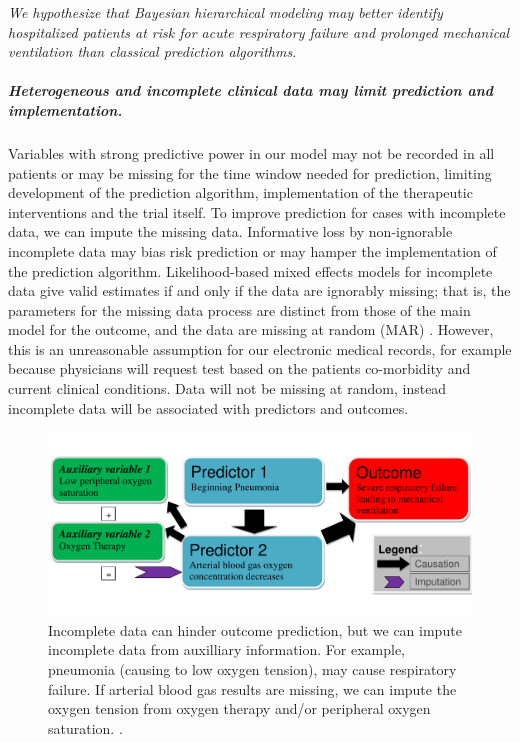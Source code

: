 \documentclass[11pt,notitlepage]{article}
\begin{document}
\emph{We hypothesize that Bayesian hierarchical modeling may better identify hospitalized patients at risk for acute respiratory failure and prolonged mechanical ventilation than classical prediction algorithms.}

\subparagraph*{Heterogeneous and incomplete clinical data may limit prediction and implementation.}
Variables with strong predictive power in our model may not be recorded in all patients or may be missing for the time window needed for prediction, limiting development of the prediction algorithm, implementation of the therapeutic interventions and the trial itself. To improve prediction for cases with incomplete data, we can impute the missing data. Informative loss by non-ignorable incomplete data may bias risk prediction or may hamper the implementation of the prediction algorithm. Likelihood-based mixed effects models for incomplete data give valid estimates if and only if the data are ignorably missing; that is, the parameters for the missing data process are distinct from those of the main model for the outcome, and the data are missing at random (MAR) \cite{Rubin_1976}. However, this is an unreasonable assumption for our electronic medical records, for example because physicians will request test based on the patients co-morbidity and current clinical conditions. Data will not be missing at random, instead incomplete data will be associated with predictors and outcomes.


\begin{figure} 
 \vspace{-30pt}
 \includegraphics[scale=0.4]{Figures/Bayesian_imputation.pdf}
    \vspace{-20pt}
  \caption{\footnotesize Incomplete data can hinder outcome prediction, but we can impute incomplete data from auxilliary information. For example, pneumonia (causing to low oxygen tension), may cause respiratory failure. If arterial blood gas results are missing, we can impute the oxygen tension from oxygen therapy and/or peripheral oxygen saturation. \cite{Hall_25389642}.}
   \vspace{-10pt}
    \label{fig:Imputation_fig}
\end{figure}
\end{document}
